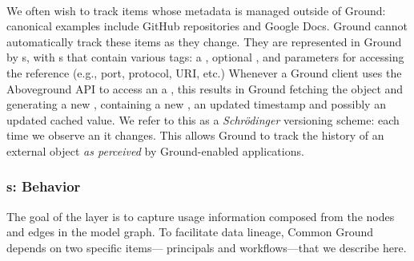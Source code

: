 \documentclass{sig-alternate}
\begin{document}
\\
We often wish to track items whose metadata is managed outside of Ground: canonical examples
include GitHub repositories and Google Docs. Ground cannot automatically track these items as they change.
They are represented in Ground by s, with s that contain various tags: a , optional , and parameters for accessing the
reference (e.g., port, protocol, URI, etc.) 
Whenever a Ground client uses the Aboveground API to access an a , this results in Ground fetching the object and generating a new , containing a new
, an updated timestamp and possibly an updated cached value. We refer to this as a \emph{Schr\"{o}dinger} versioning scheme: each time we observe an  it changes. This allows Ground to track the history of an external object \emph{as perceived} by Ground-enabled applications.


\subsubsection{{\Crust}s: Behavior}
The goal of the \crust layer is to capture usage information composed from the nodes and edges in the model graph.  
To facilitate data lineage, Common Ground depends on two specific items---
principals and workflows---that we describe here.
\end{document}
